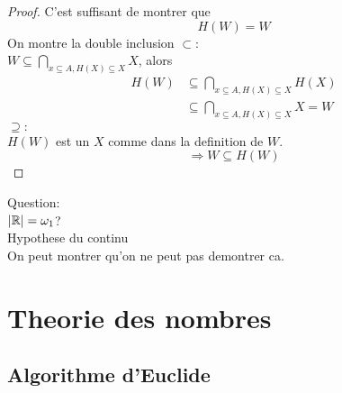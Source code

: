 \documentclass[../main.tex]{subfiles}
\begin{document}
\begin{proof}


C'est suffisant de montrer que
\[ 
	H(W) = W
\]
On montre la double inclusion
$\subset:$ \\
$W \subseteq \bigcap_{x \subseteq A, H(X) \subseteq X} X$, alors
\begin{align*}
	H(W) &\subseteq \bigcap_{x\subseteq A, H(X) \subseteq X} H(X)\\
	     &\subseteq \bigcap_{x \subseteq A, H(X) \subseteq X} X =W 
\end{align*}
$\supseteq:$ \\
$H(W)$ est un $X$ comme dans la definition de $W$.
\[ 
	\Rightarrow W \subseteq H(W)
\]
\end{proof}
Question:\\
$\left\vert \mathbb{R} \right\vert = \omega_1$?\\
Hypothese du continu\\
On peut montrer qu'on ne peut pas demontrer ca.
\section{Theorie des nombres}
\subsection{Algorithme d'Euclide}
\end{document}

